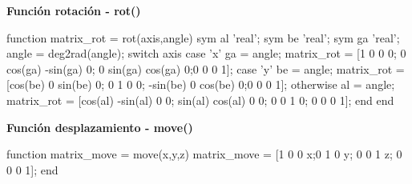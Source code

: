 \documentclass[11pt,a4paper]{article}
\begin{document}
\textbf{Función rotación - rot()}
\begin{matlabcode}
function matrix_rot = rot(axis,angle)
sym al 'real';
sym be 'real';
sym ga 'real';
angle = deg2rad(angle);
switch axis
 case 'x'
  ga = angle;
  matrix_rot = [1 0 0 0; 0 cos(ga) -sin(ga) 0; 0 sin(ga) cos(ga) 0;0 0 0 1];
 case 'y'
  be = angle;
  matrix_rot = [cos(be) 0  sin(be) 0; 0 1 0 0; -sin(be) 0 cos(be) 0;0 0 0 1];
 otherwise
  al = angle;
  matrix_rot = [cos(al) -sin(al) 0 0; sin(al) cos(al) 0 0; 0 0 1 0; 0 0 0 1];
end
end
\end{matlabcode}

\textbf{Función desplazamiento - move()}
\begin{matlabcode}
function matrix_move = move(x,y,z)
matrix_move = [1 0 0 x;0 1 0 y; 0 0 1 z; 0 0 0 1];
end
\end{matlabcode}
\end{document}
